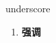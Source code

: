
\begin{frame}
{\huge underscore}
\begin{center}
\begin{enumerate}\Large
  \item \textbf{强调}
\end{enumerate}
\end{center}
\end{frame}
